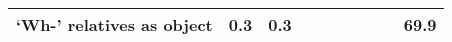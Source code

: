 \begin{table}[!t]
\begin{tabular*}{\linewidth}{@{\extracolsep{\fill}}lrrrrrrrrr}
‘Wh-’ relatives as object & 0.3 & 0.3 & {\cellcolor[HTML]{B2182B}{\textcolor[HTML]{FFFFFF}{20\%}}} & {\cellcolor[HTML]{B2182B}{\textcolor[HTML]{FFFFFF}{13\%}}} & {\cellcolor[HTML]{B2182B}{\textcolor[HTML]{FFFFFF}{8\%}}} & {\cellcolor[HTML]{B2182B}{\textcolor[HTML]{FFFFFF}{13\%}}} & {\cellcolor[HTML]{F4A582}{\textcolor[HTML]{000000}{61\%}}} & {\cellcolor[HTML]{F4A582}{\textcolor[HTML]{000000}{62\%}}} & 69.9 \\ 
\bottomrule
\end{tabular*}
\end{table}

